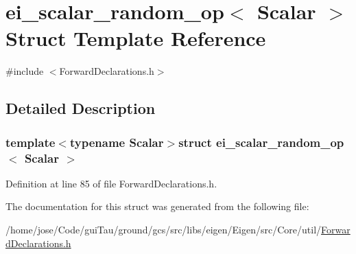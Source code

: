\hypertarget{structei__scalar__random__op}{\section{ei\-\_\-scalar\-\_\-random\-\_\-op$<$ Scalar $>$ Struct Template Reference}
\label{structei__scalar__random__op}
}


{\ttfamily \#include $<$Forward\-Declarations.\-h$>$}



\subsection{Detailed Description}
\subsubsection*{template$<$typename Scalar$>$struct ei\-\_\-scalar\-\_\-random\-\_\-op$<$ Scalar $>$}



Definition at line 85 of file Forward\-Declarations.\-h.



The documentation for this struct was generated from the following file\-:\begin{DoxyCompactItemize}
\item 
/home/jose/\-Code/gui\-Tau/ground/gcs/src/libs/eigen/\-Eigen/src/\-Core/util/\hyperlink{_forward_declarations_8h}{Forward\-Declarations.\-h}\end{DoxyCompactItemize}
